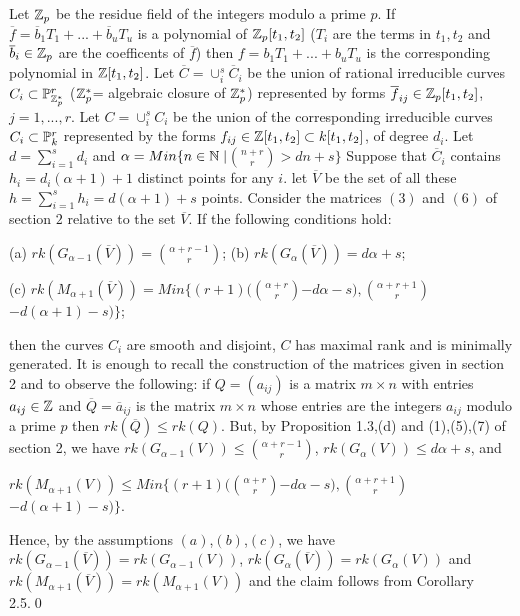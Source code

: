 Let $\Bbb Z_p$ be the residue field of the integers modulo a prime $p$.
If $\overline f=\overline b_1T_1+...+\overline b_uT_u$ is a polynomial
 of $\Bbb Z_p[t_1,t_2]$
($T_i$ are the terms in $t_1,t_2$   and $\overline b_i\in\Bbb Z_p$
are the coefficents  of $\overline f$) then
$f=b_1T_1+...+b_uT_u$ 
is the corresponding polynomial in $\Bbb Z[t_1,t_2]$. 
Let $\overline C=\cup_i^s\overline C_i$ be the union of rational
irreducible curves $C_i\subset\Bbb P_{\Bbb Z_p^*}^r$ ($\Bbb Z_p^*$= 
algebraic closure of $\Bbb Z_p^*$)
 represented by forms $\overline f_{ij}\in \Bbb Z_p[t_1,t_2]$,
$j=1,...,r$.
Let $C=\cup_i^s C_i$ be the  union of the corresponding 
irreducible curves $C_i\subset\Bbb P_k^r$
 represented by the forms $f_{ij}\in \Bbb Z[t_1,t_2]\subset k[t_1,t_2]$,
  of degree $d_i$. Let $d=\sum_{i=1}^s d_i$ and 
$\alpha=Min\{n\in\Bbb N\mid $$n+r\choose r$$ > dn+s\}$
Suppose that  $\overline C_i$ contains $h_i=d_i(\alpha+1)+1$ distinct
points for any $i$.
let $\overline V$ be the set of all these $h=\sum_{i=1}^s
h_i=d(\alpha+1)+s$
 points. Consider the  matrices $(3)$ and $(6)$ of section $2$ relative to
the set $\overline V$.
If the following conditions hold:\medskip

(a) $ rk(G_{\alpha-1}(\overline V))=$$\alpha+r-1\choose r$$ $;\medskip
(b) 
$ rk(G_\alpha(\overline V))=d\alpha+s $;\medskip

(c) $rk(M_{\alpha+1}(\overline V))= Min\{(r+1)($$\alpha+r\choose
r$$-d\alpha-s),$$\alpha+r+1\choose r$$-d(\alpha+1)-s)\}$;\medskip

then 
  the curves $C_i$ are smooth and disjoint, $C$
has maximal rank and is minimally generated.\endproclaim
{} It is enough to recall the construction of the matrices
 given in section 2 and to observe the following: if $Q=(a_{ij})$ is a
matrix
  $m\times n$ with entries $a_{ij}\in \Bbb Z$
and $\overline Q= \overline a_{ij}$ is the matrix $m\times 
n$ whose entries are the integers
$a_{ij}$ modulo a prime $p$ then $rk (\overline Q)\leq rk (Q)$.
But, by Proposition 1.3,(d) and (1),(5),(7) of section 2, we have
 $ rk(G_{\alpha-1}( V)) \leq $$\alpha+r-1\choose r$$ $,
$ rk(G_\alpha( V)) \leq d\alpha+s $, and 

$rk(M_{\alpha+1}( V)) \leq  
Min\{(r+1)($$\alpha+r\choose r$$-d\alpha-s), 
$$\alpha+r+1\choose r$$-d(\alpha+1)-s)\}$.
  
 Hence, by the assumptions $(a)$,$(b)$,$(c)$, we have
 $ rk(G_{\alpha-1}(\overline V))=rk(G_{\alpha-1}( V))$,
$ rk(G_\alpha(\overline V))=rk(G_\alpha( V))$ and 
$ rk(M_{\alpha+1}(\overline V))=rk(M_{\alpha+1}( V))$ and the
claim follows from Corollary 2.5.\qed\enddemo


